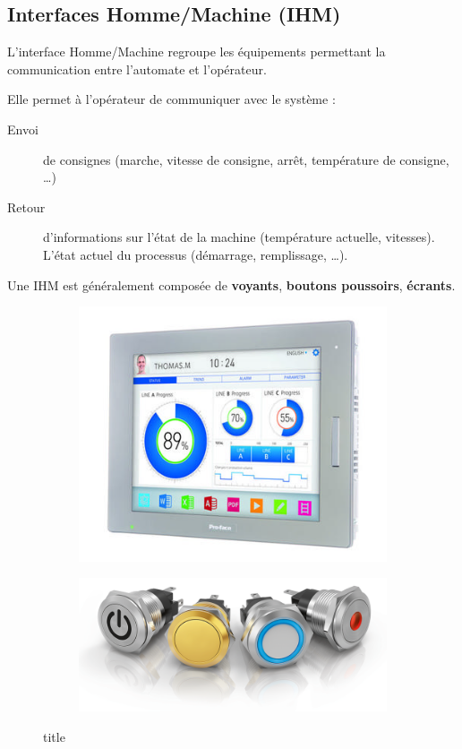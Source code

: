 \subsection{Interfaces Homme/Machine (IHM)}
L'interface Homme/Machine regroupe les équipements permettant la communication entre l'automate et l'opérateur.

 Elle permet à l'opérateur de communiquer avec le système :
 \begin{description}
   \item [Envoi] de consignes (marche, vitesse de consigne, arrêt, température de consigne, \dots)
   \item [Retour] d'informations sur l'état de la machine (température actuelle, vitesses). L'état actuel du processus (démarrage, remplissage, \dots).
 \end{description}

 Une IHM est généralement composée de \textbf{voyants}, \textbf{boutons poussoirs}, \textbf{écrants}.


\begin{figure}
  \begin{subfigure}{0.49\textwidth}
    \centering
    \includegraphics[width=\linewidth, height=.15\textheight,keepaspectratio]{images/ecranIHM}
  \end{subfigure}%
%
  \begin{subfigure}{0.49\textwidth}
    \centering
    \includegraphics[width=\linewidth,height=.15\textheight,keepaspectratio]{images/boutons}
  \end{subfigure}
  \caption{title}
\end{figure}

